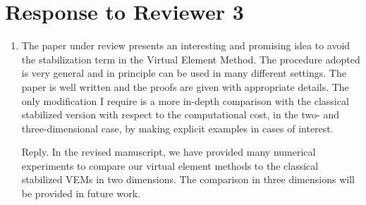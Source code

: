 \documentclass[10pt]{amsart}
\theoremstyle{definition}
\theoremstyle{remark}
\begin{document}
\section{Response to Reviewer 3}

\begin{enumerate}[1.]
\item \textsf{The paper under review presents an interesting and promising idea to avoid the stabilization term in the Virtual Element Method. The procedure adopted is very general and in principle can be used in many different settings. The paper is well written and the proofs are given with appropriate details. 
The only modification I require is a more in-depth comparison with the classical stabilized version with respect to the computational cost, in the two- and three-dimensional case, by making explicit examples in cases of interest.}

\smallskip \noindent \textcolor[rgb]{1.00,0.00,0.00}{Reply.}
In the revised manuscript, we have provided many numerical experiments to compare our virtual element methods to the classical stabilized VEMs in two dimensions. The comparison in three dimensions will be provided in future work.



\end{enumerate}





\end{document}
